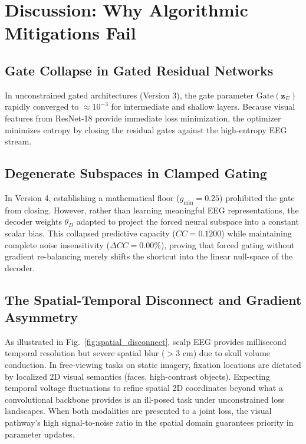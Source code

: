 \documentclass[journal,twocolumn]{IEEEtran}
\begin{document}
\section{Discussion: Why Algorithmic Mitigations Fail}

\subsection{Gate Collapse in Gated Residual Networks}
In unconstrained gated architectures (Version 3), the gate parameter $\text{Gate}(\mathbf{z}_E)$ rapidly converged to $\approx 10^{-3}$ for intermediate and shallow layers. Because visual features from ResNet-18 provide immediate loss minimization, the optimizer minimizes entropy by closing the residual gates against the high-entropy EEG stream.

\subsection{Degenerate Subspaces in Clamped Gating}
In Version 4, establishing a mathematical floor ($g_{\min} = 0.25$) prohibited the gate from closing. However, rather than learning meaningful EEG representations, the decoder weights $\theta_D$ adapted to project the forced neural subspace into a constant scalar bias. This collapsed predictive capacity ($CC = 0.1200$) while maintaining complete noise insensitivity ($\Delta CC = 0.00\%$), proving that forced gating without gradient re-balancing merely shifts the shortcut into the linear null-space of the decoder.

\subsection{The Spatial-Temporal Disconnect and Gradient Asymmetry}
As illustrated in Fig.~\ref{fig:spatial_disconnect}, scalp EEG provides millisecond temporal resolution but severe spatial blur ($>3\text{ cm}$) due to skull volume conduction. In free-viewing tasks on static imagery, fixation locations are dictated by localized 2D visual semantics (faces, high-contrast objects). Expecting temporal voltage fluctuations to refine spatial 2D coordinates beyond what a convolutional backbone provides is an ill-posed task under unconstrained loss landscapes. When both modalities are presented to a joint loss, the visual pathway's high signal-to-noise ratio in the spatial domain guarantees priority in parameter updates.
\end{document}
